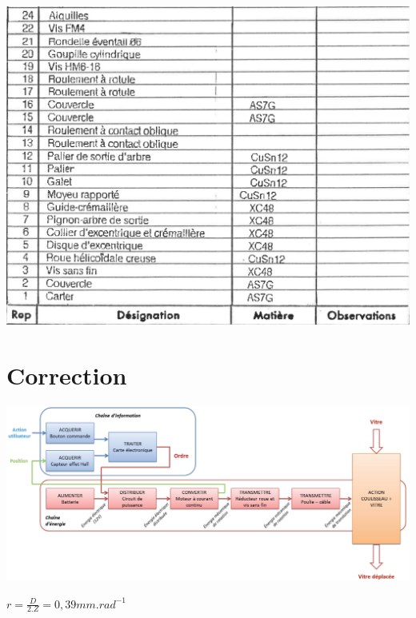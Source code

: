 





\begin{center}
	\includegraphics[width=0.7\linewidth]{img/Commande_essui_glace_nom.pdf}
\end{center}



\ifdef{\public}{}{}

\newpage
\cleardoublepage

\pagestyle{correction}

\section{Correction}


\begin{center}
 \centering\includegraphics[width=0.9\linewidth]{img/dr1_cor}
\end{center}


$r=\frac{D}{2.Z}=0,39mm.rad^{-1}$

